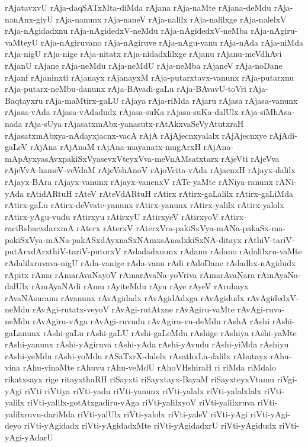 {rAjatavxvU
rAja-daqSATxMta-diMda
rAjana
rAja-naMte
rAjana-deMdu
rAja-nanAnx-giyU
rAja-nanunx
rAja-naneV
rAja-nalilx
rAja-nalilxge
rAja-nalelxV
rAja-nAgidadxnu
rAja-nAgidedxV-neMdu
rAja-nAgidedxV-neMba
rAja-nAgiru-vaMteyU
rAja-nAgiruvano
rAja-nAgiruve
rAja-nAgu-vanu
rAja-nAda
rAja-niMda
rAja-nigU
rAja-nige
rAja-nitatx
rAja-nidadxlilxge
rAjanu
rAjanu-meVdhAvi
rAjanU
rAjane
rAja-neMdu
rAja-neMdU
rAja-neMba
rAjaneV
rAja-noDane
rAjanf
rAjaninxti
rAjanayx
rAjanayxM
rAja-putarxtavx-vanunx
rAja-putarxnu
rAja-putarx-neMbu-danunx
rAja-BAvadi-gaLu
rAja-BAvavU-toVri
rAja-Baqtayxru
rAja-maMtirx-gaLU
rAjaya
rAja-riMda
rAjaru
rAjasa
rAjasa-vanunx
rAjasa-vAda
rAjasa-vAdadudx
rAjasa-suKa
rAjasa-suKa-dalUlx
rAja-siMhAsa-nada
rAja-sUya
rAjasatxmAbx-yanasutx-rAtAkxvaSeVyAtutxraH
rAjasatxmAbxya-nAdayxjacnx-vacA
rAjA
rAjAjecnxyalalx
rAjAjecnxye
rAjAdi-gaLeV
rAjAna
rAjAnaM
rAjAna-mayanatx-mugArxH
rAjAna-mApAyxyasAvxpakiSxVyasevxVteyxVva-meVnAMsatxtarx
rAjeVti
rAjeVva
rAjeVvA-hameV-veVdaM
rAjeVshAnoV
rAjoVcita-vAda
rAjacnxH
rAjayx-dalilx
rAjayx-BAra
rAjayx-vanunx
rAjayx-vanenxV
rATe-yaMte
rANiya-ranunx
rANi-yAda
rAtidARtuH
rAteV
rAteVdARtuH
rAtirx
rAtirx-gaLalilx
rAtirx-gaLiMda
rAtirx-gaLu
rAtirx-deVvate-yanunx
rAtirx-yanunx
rAtirx-yalilx
rAtirx-yalolx
rAtirx-yAgu-vudu
rAtirxyu
rAtirxyU
rAtirxyeV
rAtirxyoV
rAtirx-raciRshacxdarxmA
rAterx
rAterxV
rAterxVra-pakiSxVya-mANa-pakaSx-ma-pakiSxVya-mANa-pakASxdAyxnaSxNAmxsAnadxkiSxNA-ditayx
rAthiV-tariV-putArxdArxthiV-tariV-putorxV
rAdadadxnunx
rAdanu
rAdano
rAdalilxru-vaMte
rAdalilxruvava-nigU
rAda-vanige
rAda-vanu
rAdi
rAdoDane
rAdadhx-nAgidudx
rApitx
rAma
rAmarAvaNayoV
rAmarAvaNa-yoVriva
rAmarAvaNara
rAmAyaNa-dalUlx
rAmAyaNAdi
rAmu
rAyiteMdu
rAyu
rAye
rAyeV
rAruhayx
rAvaNAsuranu
rAvanunx
rAvAgidadx
rAvAgidAdxga
rAvAgidudx
rAvAgidedxV-neMdu
rAvAgi-rutatx-veyoV
rAvAgi-rutAtxne
rAvAgiru-vaMte
rAvAgi-ruva-neMdu
rAvAgiru-vAga
rAvAgi-ruvudu
rAvAgiru-vu-deMdu
rAshA
rAshi
rAshi-gaLanunx
rAshi-gaLu
rAshi-gaLU
rAshi-gaLeMdu
rAshige
rAshiya
rAshi-yaMte
rAshi-yanunx
rAshi-yAgiruva
rAshi-yAda
rAshi-yAvudu
rAshi-yiMda
rAshiyu
rAshi-yeMdu
rAshi-yoMdu
rASaTxrX-dalelx
rAsathxLa-dalilx
rAhutayx
rAhu-vina
rAhu-vinaMte
rAhuvu
rAhu-veMdU
rAhoVHshiraH
ri
riMda
riMdalo
rikatxsayx
rige
ritayxthaRH
riSayxti
riSayxtayx-BayaM
riSayxteyxVtamu
riVgi-yAgi
riVti
riVtiya
riVti-yadu
riVti-yanunx
riVti-yalalx
riVti-yalalxlalx
riVti-yalilx
riVti-yalilx-gotAtxgadiru-vAga
riVti-yalilxyoV
riVti-yalilxruva
riVti-yalilxruvu-dariMda
riVti-yalUlx
riVti-yalolx
riVti-yaleV
riVti-yAgi
riVti-yAgi-deyo
riVti-yAgidadx
riVti-yAgidadxMte
riVti-yAgidadxrU
riVti-yAgidudx
riVti-yAgi-yAdarU
}
